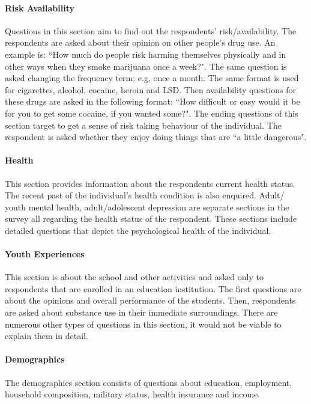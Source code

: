 \documentclass[12pt]{article}
\begin{document}
\paragraph{Risk Availability}
Questions in this section aim to find out the respondents’ risk/availability. The respondents are asked about their opinion on other people’s drug use. An example is: ``How much do people risk harming themselves physically and in other ways when they smoke marijuana once a week?".  The same question is asked changing the frequency term; e.g, once a month. The same format is used for cigarettes, alcohol, cocaine, heroin and LSD. Then availability questions for these drugs are asked in the following format: ``How difficult or easy would it be for you to get some cocaine, if you wanted some?". The ending questions of this section target to get a sense of risk taking behaviour of the individual. The respondent is asked whether they enjoy doing things that are ``a little dangerous". 

\paragraph{Health}
This section provides information about the respondents current health status. The recent past of the individual’s health condition is also enquired. Adult/ youth mental health, adult/adolescent depression are separate sections in the survey all regarding the health status of the respondent. These sections include detailed questions that depict the psychological health of the individual.

\paragraph{Youth Experiences}
This section is about the school and other activities and asked only to respondents that are enrolled in an education institution. The first questions are about the opinions and overall performance of the students. Then, respondents are asked about substance use in their immediate surroundings. There are numerous other types of questions in this section, it would not be viable to explain them in detail.

\paragraph{Demographics}
The demographics section consists of questions about education, employment, household composition, military status, health insurance and income. 
\end{document}
